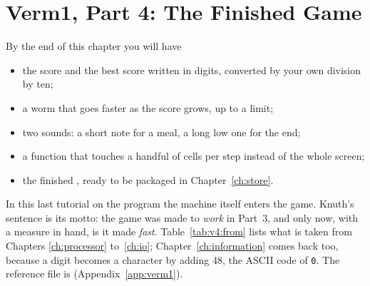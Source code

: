 \chapter{Verm1, Part 4: The Finished Game}
\label{ch:verm1p4}


\begin{chapgoals}
By the end of this chapter you will have
\begin{itemize}
\item the score and the best score written in digits, converted by your own division by ten;
\item a worm that goes faster as the score grows, up to a limit;
\item two sounds: a short note for a meal, a long low one for the end;
\item a  function that touches a handful of cells per step instead of the whole screen;
\item the finished \vermone, ready to be packaged in Chapter~\ref{ch:store}.
\end{itemize}
\end{chapgoals}


In this last tutorial on the program the machine itself enters the game.
Knuth's sentence is its motto: the game was made to \emph{work} in Part~3,
and only now, with a measure in hand, is it made \emph{fast}.
Table~\ref{tab:v4:from} lists what is taken from Chapters \ref{ch:processor}
to~\ref{ch:io}; Chapter~\ref{ch:information} comes back too, because a digit
becomes a character by adding 48, the ASCII code of \texttt{0}. The reference
file is  (Appendix~\ref{app:verm1}).

